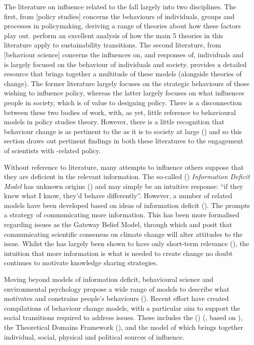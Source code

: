 The literature on influence related to the \SPI{} fall largely into two disciplines. The first, from [policy studies] concerns the behaviours of individuals, groups and processes in policymaking, deriving a range of theories about how these factors play out. \textcite{KernR2018} perform an excellent analysis of how the main 5 theories in this literature apply to sustainability transitions. The second literature, from [behaviour science] concerns the influences on, and responses of, individuals and is largely focused on the behaviour of individuals and society. \textcite{Darnton2008} provides a detailed resource that brings together a multitude of these models (alongside theories of change). The former literature largely focuses on the strategic behaviours of those wishing to influence policy, whereas the latter largely focuses on what influences people in society, which is of value to designing policy. There is a disconnection between these two bodies of work, with, as yet, little reference to behavioural models in policy studies theory. However, there is a little recognition that behaviour change is as pertinent to the \SPI{} as it is to society at large (\cite{CairneyW2017}) and so this section draws out pertinent findings in both these literatures to the engagement of scientists with \CAN-related policy.

Without reference to literature, many attempts to influence others suppose that they are deficient in the relevant information. The so-called  (\IDM) \emph{Information Deficit Model} has unknown origins (\cite{Nerlich2017}) and may simply be an intuitive response: ``if they knew what I know, they'd behave differently''. However, a number of related models have been developed based on ideas of information deficit (\cite{Darnton2008}). The \IDM{} prompts a strategy of communicating more information. This has been more formalised regarding \CAN{} issues as the Gateway Belief Model, through which \textcite{vanderLindenLFM2015} and \textcite{vanderLinden2021} posit that communicating scientific consensus on climate change will alter attitudes to the issue. Whilst the \IDM{} has largely been shown to have only short-term relevance (\cite[p24-5]{BA2024trust}), the intuition that more information is what is needed to create change no doubt continues to motivate knowledge sharing strategies.

Moving beyond models of information deficit, behavioural science and environmental psychology propose a wide range of models to describe what motivates and constrains people's behaviours (\cite{Darnton2008}). Recent effort have created compilations of behaviour change models, with a particular aim to support the social transitions required to address \CAN{} issues. These includes the  (\ISM) (\cite{DarntonH2013}, based on \cite{SouthertonME2011}), the Theoretical Domains Framework (\cite{AtkinsFIOPIFDCGLM2017}), and the model of \textcite{HamptonW2023} which brings together individual, social, physical and political sources of influence. 

